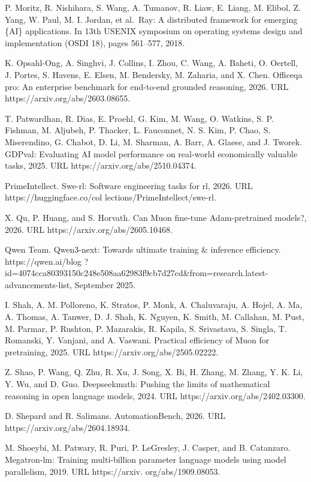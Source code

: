 P. Moritz, R. Nishihara, S. Wang, A. Tumanov, R. Liaw, E. Liang, M.
Elibol, Z. Yang, W. Paul, M. I. Jordan, et al.~Ray: A distributed
framework for emerging \{AI\} applications. In 13th USENIX symposium on
operating systems design and implementation (OSDI 18), pages 561--577,
2018.



K. Opsahl-Ong, A. Singhvi, J. Collins, I. Zhou, C. Wang, A. Baheti, O.
Oertell, J. Portes, S. Havens, E. Elsen, M. Bendersky, M. Zaharia, and
X. Chen. Officeqa pro: An enterprise benchmark for end-to-end grounded
reasoning, 2026. URL https://arxiv.org/abs/2603.08655.

T. Patwardhan, R. Dias, E. Proehl, G. Kim, M. Wang, O. Watkins, S. P.
Fishman, M. Aljubeh, P. Thacker, L. Fauconnet, N. S. Kim, P. Chao, S.
Miserendino, G. Chabot, D. Li, M. Sharman, A. Barr, A. Glaese, and J.
Tworek. GDPval: Evaluating AI model performance on real-world
economically valuable tasks, 2025. URL https://arxiv.org/abs/2510.04374.

PrimeIntellect. Swe-rl: Software engineering tasks for rl, 2026. URL
https://huggingface.co/col lections/PrimeIntellect/swe-rl.

X. Qu, P. Huang, and S. Horvath. Can Muon fine-tune Adam-pretrained
models?, 2026. URL https://arxiv.org/abs/2605.10468.

Qwen Team. Qwen3-next: Towards ultimate training \& inference efficiency.
https://qwen.ai/blog
?id=4074cca80393150c248e508aa62983f9cb7d27cd\&from=research.latest-advancements-list,
September 2025.

I. Shah, A. M. Polloreno, K. Stratos, P. Monk, A. Chaluvaraju, A. Hojel,
A. Ma, A. Thomas, A. Tanwer, D. J. Shah, K. Nguyen, K. Smith, M.
Callahan, M. Pust, M. Parmar, P. Rushton, P. Mazarakis, R. Kapila, S.
Srivastava, S. Singla, T. Romanski, Y. Vanjani, and A. Vaswani.
Practical efficiency of Muon for pretraining, 2025. URL
https://arxiv.org/abs/2505.02222.

Z. Shao, P. Wang, Q. Zhu, R. Xu, J. Song, X. Bi, H. Zhang, M. Zhang, Y.
K. Li, Y. Wu, and D. Guo. Deepseekmath: Pushing the limits of
mathematical reasoning in open language models, 2024. URL
https://arxiv.org/abs/2402.03300.

D. Shepard and R. Salimans. AutomationBench, 2026. URL
https://arxiv.org/abs/2604.18934.

M. Shoeybi, M. Patwary, R. Puri, P. LeGresley, J. Casper, and B.
Catanzaro. Megatron-lm: Training multi-billion parameter language models
using model parallelism, 2019. URL https://arxiv. org/abs/1909.08053.

